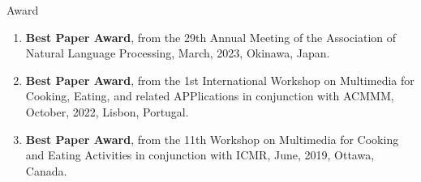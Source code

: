 \begin{rSection}{Award}
\begin{enumerate}
    \item {\bf Best Paper Award}, from the 29th Annual Meeting of the Association of Natural Language Processing, March, 2023, Okinawa, Japan.
    \item {\bf Best Paper Award}, from the 1st International Workshop on Multimedia for Cooking, Eating, and related APPlications in conjunction with ACMMM, October, 2022, Lisbon, Portugal.
    \item {\bf Best Paper Award}, from the 11th Workshop on Multimedia for Cooking and Eating Activities in conjunction with ICMR, June, 2019, Ottawa, Canada.
\end{enumerate}
\end{rSection}